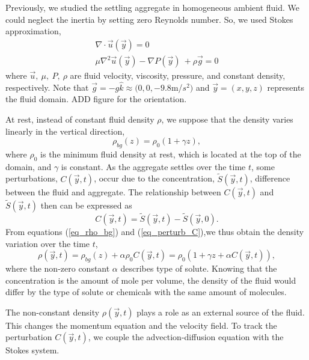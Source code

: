 Previously, we studied the settling aggregate in homogeneous ambient fluid. We could neglect the inertia by setting zero Reynolds number. So, we used Stokes approximation, 
\begin{align}
	\nabla \cdot \vec{u} (\vec{y}) = 0  \label{eq_conti2}
	\\
	\mu \nabla^2 \vec{u} (\vec{y})   - \nabla P(\vec{y}) \ + \rho  \vec{g} = 0
	\label{eq_stokes2}
\end{align}
where $\vec{u}, \ \mu, \ P, \ \rho$ are fluid velocity, viscosity, pressure, and constant density, respectively.
Note that $\vec{g} = - g\hat{k} \approx (0,0,-9.8$m/$s^2)$ and $\vec{y} = (x,y,z)$ represents the fluid domain. {\color{blue} ADD figure for the orientation.} 
\par
At rest, instead of constant fluid density $\rho$, we suppose that the density varies linearly in the vertical direction,
\begin{equation}
\rho_{bg}(z) =  \rho_0 \left(1 + \gamma z \right),
\label{eq_rho_bg}
\end{equation}
where $\rho_0$ is the minimum fluid density at rest, which is located at the top of the domain, and $\gamma$ is constant.
As the aggregate settles over the time $t$, some perturbations, $C(\vec{y},t)$, occur due to the concentration, $\tilde{S}(\vec{y},t)$, difference between the fluid and aggregate. 
The relationship between $C(\vec{y},t)$ and $\tilde{S}(\vec{y},t)$ then can be expressed as
\begin{equation}
C(\vec{y}, t) =  \tilde{S}(\vec{y},t) - \tilde{S}(\vec{y},0).
\label{eq_perturb_C}
\end{equation}
From equations (\ref{eq_rho_bg}) and (\ref{eq_perturb_C}),we thus obtain the density variation over the time $t$,
\begin{equation}
	\rho(\vec{y},t ) 
	= \rho_{bg}(z) +  \alpha \rho_0 C(\vec{y},t) 
	 = \rho_0 \left( 1 + \gamma z  + \alpha  C(\vec{y},t) \right),
\label{eq_density}
\end{equation}
where the non-zero constant $\alpha $ describes type of solute. Knowing that the concentration is the amount of mole per volume, the density of the fluid would differ by the type of solute or chemicals with the same amount of molecules.
\par
The non-constant density $\rho(\vec{y},t)$ plays a role as an external source of the fluid. This changes the momentum equation and the velocity field. To track the perturbation $C(\vec{y},t)$, we couple the advection-diffusion equation with the Stokes system. 
